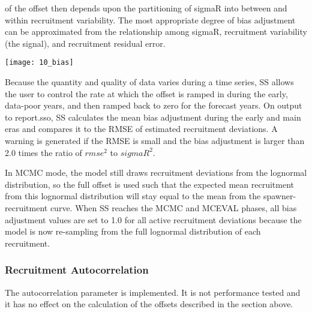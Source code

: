 \noindent of the offset then depends upon the partitioning of sigmaR into between and within recruitment variability.  The most appropriate degree of bias adjustment can be approximated from the relationship among sigmaR, recruitment variability (the signal), and recruitment residual error.

\begin{center}
	\texttt{[image: 10\_bias]}
\end{center}

Because the quantity and quality of data varies during a time series, SS allows the user to control the rate at which the offset is ramped in during the early, data-poor years, and then ramped back to zero for the forecast years.
On output to report.sso, SS calculates the mean bias adjustment during the early and main eras and compares it to the RMSE of estimated recruitment deviations.  A warning is generated if the RMSE is small and the bias adjustment is larger than 2.0 times the ratio of $rmse^2$ to $sigmaR^2$.

In MCMC mode, the model still draws recruitment deviations from the lognormal distribution, so the full offset is used such that the expected mean recruitment from this lognormal distribution will stay equal to the mean from the spawner-recruitment curve. When SS reaches the MCMC and MCEVAL phases, all bias adjustment values are set to 1.0 for all active recruitment deviations because the model is now re-sampling from the full lognormal distribution of each recruitment.

\subsubsection{Recruitment Autocorrelation}
The autocorrelation parameter is implemented.  It is not performance tested and it has no effect on the calculation of the offsets described in the section above.

